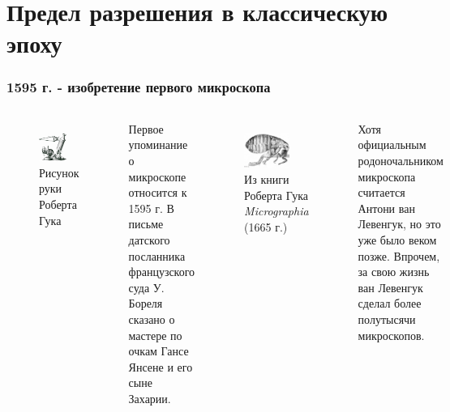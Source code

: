 \documentclass[9pt, compress, xcolor=table]{beamer}
\begin{document}
\section{Предел разрешения в классическую эпоху}
\begin{frame}[fragile]
  \frametitle{1595 г. - изобретение первого микроскопа}
\begin{columns}[c]
\column{6cm}
\begin{figure}
\centering
\includegraphics[width=0.7\textwidth]{microscope}
\\ Рисунок руки Роберта Гука
\end{figure}
Первое упоминание о микроскопе относится к 1595 г. В письме датского посланника французского суда У. Бореля сказано о мастере по очкам Гансе Янсене и его сыне Захарии. 
\column{6cm}
\begin{figure}
\centering
\includegraphics[width=0.7\textwidth]{flea}
\\ Из книги Роберта Гука \emph{Micrographia} 
\newline (1665 г.)
\end{figure}
Хотя официальным родоночальником микроскопа считается Антони ван Левенгук, но это уже было веком позже. Впрочем, за свою жизнь ван Левенгук сделал более полутысячи микроскопов.
\end{columns}
\end{frame}
\end{document}
